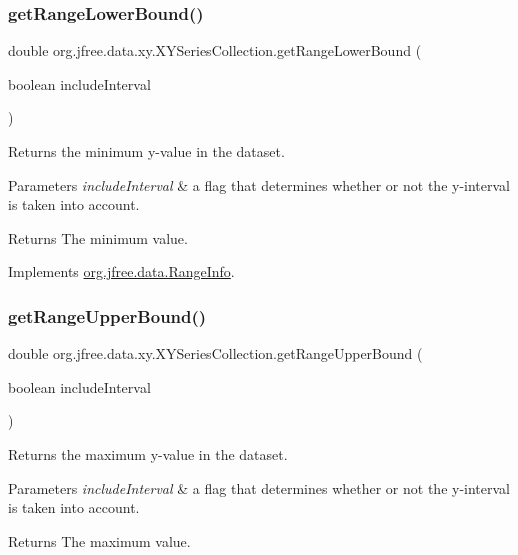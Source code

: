 \subsubsection{\texorpdfstring{get\+Range\+Lower\+Bound()}{getRangeLowerBound()}}
{\footnotesize\ttfamily double org.\+jfree.\+data.\+xy.\+X\+Y\+Series\+Collection.\+get\+Range\+Lower\+Bound (\begin{DoxyParamCaption}\item[{boolean}]{include\+Interval }\end{DoxyParamCaption})}

Returns the minimum y-\/value in the dataset.


\begin{DoxyParams}{Parameters}
{\em include\+Interval} & a flag that determines whether or not the y-\/interval is taken into account.\\
\hline
\end{DoxyParams}
\begin{DoxyReturn}{Returns}
The minimum value. 
\end{DoxyReturn}


Implements \mbox{\hyperlink{interfaceorg_1_1jfree_1_1data_1_1_range_info_ab0187015bbe75ca00a62a71de72c1a1d}{org.\+jfree.\+data.\+Range\+Info}}.

\mbox{\label{classorg_1_1jfree_1_1data_1_1xy_1_1_x_y_series_collection_a2d165d7e676b4d1350aeabb8b503270f}} 
\subsubsection{\texorpdfstring{get\+Range\+Upper\+Bound()}{getRangeUpperBound()}}
{\footnotesize\ttfamily double org.\+jfree.\+data.\+xy.\+X\+Y\+Series\+Collection.\+get\+Range\+Upper\+Bound (\begin{DoxyParamCaption}\item[{boolean}]{include\+Interval }\end{DoxyParamCaption})}

Returns the maximum y-\/value in the dataset.


\begin{DoxyParams}{Parameters}
{\em include\+Interval} & a flag that determines whether or not the y-\/interval is taken into account.\\
\hline
\end{DoxyParams}
\begin{DoxyReturn}{Returns}
The maximum value. 
\end{DoxyReturn}


